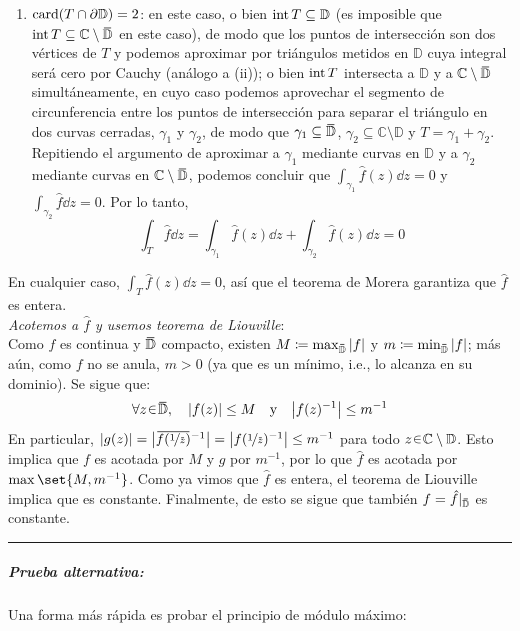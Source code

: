\begin{sol}
\begin{enumerate}[label=(\roman*), leftmargin=1.6em]
\item $\operatorname{card}(T \cap \partial\mathbb{D}) = 2$: en este caso, o bien $\operatorname{int} T \subseteq \mathbb{D}$ (es imposible que $\inter T \subseteq  \mathbb{C}\setminus\ubar{\mathbb{D}}$ en este caso), de modo que los puntos de intersección son dos vértices de $T$ y podemos aproximar por triángulos metidos en $\mathbb{D}$ cuya integral será cero por Cauchy (análogo a (ii)); o bien $\operatorname{int} T$ intersecta a $\mathbb{D}$ y a $\mathbb{C}\setminus\ubar{\mathbb{D}}$ simultáneamente, en cuyo caso podemos aprovechar el segmento de circunferencia entre los puntos de intersección para separar el triángulo en dos curvas cerradas, $\gamma_1$ y $\gamma_2$, de modo que $\gamma_1 \subseteq \ubar{\mathbb{D}}$, $\gamma_2 \subseteq \mathbb{C}\setminus\mathbb{D}$ y $T = \gamma_1 + \gamma_2$. Repitiendo el argumento de aproximar a $\gamma_1$ mediante curvas en $\mathbb{D}$ y a $\gamma_2$ mediante curvas en $\mathbb{C}\setminus\ubar{\mathbb{D}}$, podemos concluir que $\int_{\gamma_1} \hat{f}(z) \dd{z} = 0$ y $\int_{\gamma_2} \hat{f} \dd{z} = 0$. Por lo tanto,
\[
\int_T \hat{f} \dd{z} = \int_{\gamma_1} \hat{f}(z) \dd{z} + \int_{\gamma_2} \hat{f}(z) \dd{z} = 0
\]
\end{enumerate}
En cualquier caso, $\int_{T} \hat{f}(z) \dd{z}=0$, así que el teorema de Morera garantiza que $\hat{f}$ es entera.\vspace{1em}\\
\emph{Acotemos a $\hat{f}$ y usemos teorema de Liouville}:\\
Como $f$ es continua y $\ubar{\mathbb{D}}$ compacto, existen $M \coloneq \max_{\ubar{\mathbb{D}}} \abs{f}$ y $m \coloneq \min_{\ubar{\mathbb{D}}} \abs{f}$; más aún, como $f$ no se anula, $m > 0$ (ya que es un mínimo, i.e., lo alcanza en su dominio). Se sigue que:
\[
\forall z \en \ubar{\mathbb{D}}, \quad%
\abs{f(z)} \leq M \quad\text{y}\quad \abs{f(z)^{-1}} \leq m^{-1}
\]
En particular, $\abs{g(z)} = \abs{\ubar{f(\nicefrac{1}{\ubar{z}})}^{-1}} = \abs{f(\nicefrac{1}{\ubar{z}})^{-1}} \leq m^{-1}$ para todo $z \en \mathbb{C}\setminus\mathbb{D}$.
Esto implica que $f$ es acotada por $M$ y $g$ por $m^{-1}$, por lo que $\hat{f}$ es acotada por $\max\set{M,m^{-1}}$. Como ya vimos que $\hat{f}$ es entera, el teorema de Liouville implica que es constante. Finalmente, de esto se sigue que también $f = \hat{f}|_{\ubar{\mathbb{D}}}$ es constante.
\vspace{1em}
\hrule
\subparagraph{Prueba alternativa:}
Una forma más rápida es probar el principio de módulo máximo:
\begin{lema}\label{lema:max}

\end{lema}
\end{sol}

